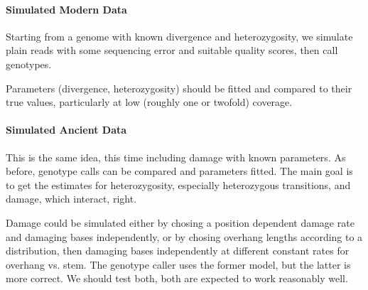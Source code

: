 \documentclass{article}
\begin{document}


\paragraph{Simulated Modern Data}

Starting from a genome with known divergence and heterozygosity, we
simulate plain reads with some sequencing error and suitable quality
scores, then call genotypes.

Parameters (divergence, heterozygosity) should be fitted and compared to
their true values, particularly at low (roughly one or twofold)
coverage.


\paragraph{Simulated Ancient Data}

This is the same idea, this time including damage with known parameters.
As before, genotype calls can be compared and parameters fitted.  The
main goal is to get the estimates for heterozygosity, especially
heterozygous transitions, and damage, which interact, right.

Damage could be simulated either by chosing a position dependent damage
rate and damaging bases independently, or by chosing overhang lengths
according to a distribution, then damaging bases independently at
different constant rates for overhang vs. stem.  The genotype caller
uses the former model, but the latter is more correct.  We should test
both, both are expected to work reasonably well.

\end{document}

